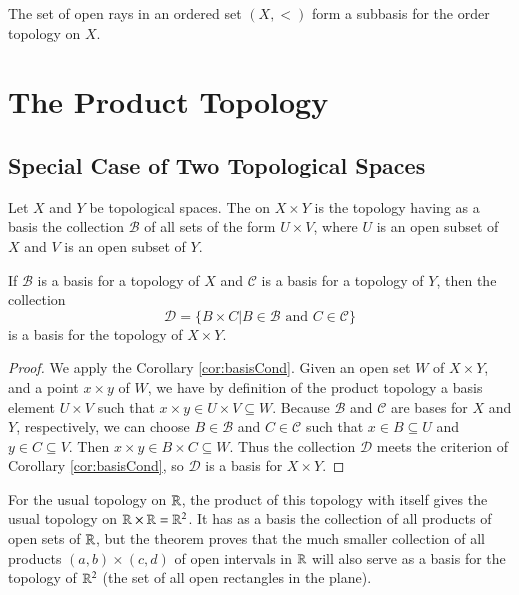 \documentclass[12pt, a4paper, oneside, openright, titlepage]{book}
\begin{document}
\begin{remark}
    The set of open rays in an ordered set $(X,<)$ form a subbasis for the order topology on $X$.
\end{remark}


\section{The Product Topology}

\subsection{Special Case of Two Topological Spaces}

\begin{definition}
    Let $X$ and $Y$ be topological spaces. The  on $X\times Y$ is the topology having as a basis the collection $\mathcal{B}$ of all sets of the form $U\times V$, where $U$ is an open subset of $X$ and $V$ is an open subset of $Y$.
\end{definition}


\begin{theorem}
    If $\mathcal{B}$ is a basis for a topology of $X$ and $\mathcal{C}$ is a basis for a topology of $Y$, then the collection\begin{equation*}
        \mathcal{D} = \{B\times C\vert B \in \mathcal{B}\text{ and } C \in \mathcal{C}\}
    \end{equation*}
    is a basis for the topology of $X\times Y$.
\end{theorem}
\begin{proof}
    We apply the Corollary \ref{cor:basisCond}. Given an open set $W$ of $X\times Y$, and a point $x\times y$ of $W$, we have by definition of the product topology a basis element $U\times V$ such that $x\times y \in U\times V \subseteq W$. Because $\mathcal{B}$ and $\mathcal{C}$ are bases for $X$ and $Y$, respectively, we can choose $B \in \mathcal{B}$ and $C \in \mathcal{C}$ such that $x \in B \subseteq U$ and $y \in C \subseteq V$. Then $x \times y \in B\times C\subseteq W$. Thus the collection $\mathcal{D}$ meets the criterion of Corollary \ref{cor:basisCond}, so $\mathcal{D}$ is a basis for $X\times Y$.
\end{proof}


\begin{example}
    For the usual topology on $\mathbb R$, the product of this topology with itself gives the usual topology on $\mathbb R\times \mathbb R = \mathbb R^2$. It has as a basis the collection of all products of open sets of $\mathbb R$, but the theorem proves that the much smaller collection of all products $(a,b)\times(c,d)$ of open intervals in $\mathbb R$ will also serve as a basis for the topology of $\mathbb R^2$ (the set of all open rectangles in the plane).
\end{example}
\end{document}
